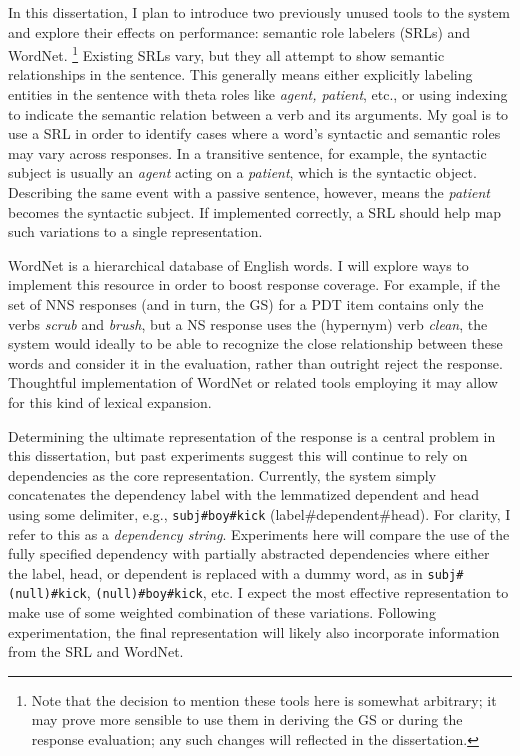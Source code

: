 In this dissertation, I plan to introduce two previously unused tools to the system and explore their effects on performance: semantic role labelers (SRLs) and WordNet. \footnote{Note that the decision to mention these tools here is somewhat arbitrary; it may prove more sensible to use them in deriving the GS or during the response evaluation; any such changes will reflected in the dissertation.} Existing SRLs vary, but they all attempt to show semantic relationships in the sentence. This generally means either explicitly labeling entities in the sentence with theta roles like \textit{agent, patient}, etc., or using indexing to indicate the semantic relation between a verb and its arguments. My goal is to use a SRL in order to identify cases where a word's syntactic and semantic roles may vary across responses. In a transitive sentence, for example, the syntactic subject is usually an \textit{agent} acting on a \textit{patient}, which is the syntactic object. Describing the same event with a passive sentence, however, means the \textit{patient} becomes the syntactic subject. If implemented correctly, a SRL should help map such variations to a single representation.
\par
WordNet is a hierarchical database of English words. I will explore ways to implement this resource in order to boost response coverage. For example, if the set of NNS responses (and in turn, the GS) for a PDT item contains only the verbs \textit{scrub} and \textit{brush}, but a NS response uses the (hypernym) verb \textit{clean}, the system would ideally to be able to recognize the close relationship between these words and consider it in the evaluation, rather than outright reject the response. Thoughtful implementation of WordNet or related tools employing it may allow for this kind of lexical expansion.
\par
Determining the ultimate representation of the response is a central problem in this dissertation, but past experiments suggest this will continue to rely on dependencies as the core representation.  Currently, the system simply concatenates the dependency label with the lemmatized dependent and head using some delimiter, e.g., \texttt{subj\#boy\#kick} (label\#dependent\#head). For clarity, I refer to this as a \textit{dependency string}. Experiments here will compare the use of the fully specified dependency with partially abstracted dependencies where either the label, head, or dependent is replaced with a dummy word, as in \texttt{subj\#(null)\#kick}, \texttt{(null)\#boy\#kick}, etc. I expect the most effective representation to make use of some weighted combination of these variations. Following experimentation, the final representation will likely also incorporate information from the SRL and WordNet.\\
